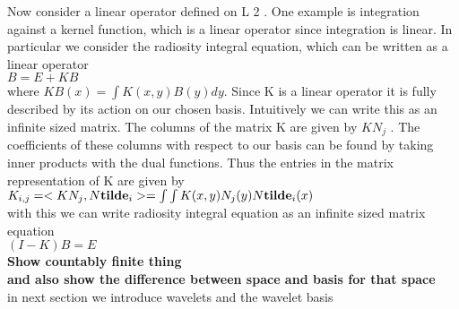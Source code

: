 Now consider a linear operator defined on L 2 . One example is
integration against a kernel function, which is a linear operator since integration is linear. In particular we consider the radiosity
integral equation, which can be written as a linear operator\\

$B=E+KB$\\

where $KB(x) = \int K(x, y)B(y)dy$. Since K is a linear operator it
is fully described by its action on our chosen basis. Intuitively we
can write this as an infinite sized matrix. The columns of the matrix K are given by $KN_j$ . The coefficients of these columns with
respect to our basis can be found by taking inner products with
the dual functions. Thus the entries in the matrix representation
of K are given by\\

$K_{i,j}=<KN_j,N{\bf tilde}_i>=\int \int K(x,y)N_j(y)N{\bf tilde}_i(x)$\\

with this we can write radiosity integral equation as an infinite sized matrix equation\\

$(I-K)B=E$\\

{\bf Show countably finite thing \\ and also show the difference between space and basis for that space}\\

in next section we introduce wavelets and the wavelet basis
\\\\